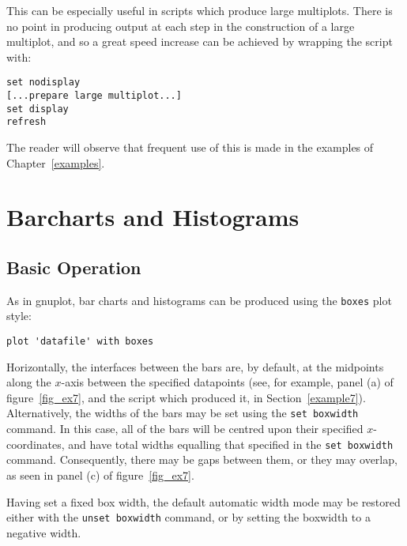\documentclass[a4paper,onecolumn,11pt]{book}
\begin{document}
This can be especially useful in scripts which produce large multiplots. There
is no point in producing output at each step in the construction of a large
multiplot, and so a great speed increase can be achieved by wrapping the script
with:

\begin{verbatim} 
set nodisplay
[...prepare large multiplot...]
set display
refresh
\end{verbatim}

The reader will observe that frequent use of this is made in the examples of
Chapter~\ref{examples}.

\section{Barcharts and Histograms}
\label{barcharts}

\subsection{Basic Operation}

As in gnuplot, bar charts and histograms can be produced using the
\texttt{boxes} plot style:

\begin{verbatim} 
plot 'datafile' with boxes
\end{verbatim}

\noindent Horizontally, the interfaces between the bars are, by default, at the
midpoints along the $x$-axis between the specified datapoints (see, for
example, panel (a) of figure~\ref{fig_ex7}, and the script which produced it,
in Section~\ref{example7}).  Alternatively, the widths of the bars may be set
using the \texttt{set boxwidth} command. In this case, all of the bars will be
centred upon their specified $x$-coordinates, and have total widths equalling
that specified in the \texttt{set boxwidth} command. Consequently, there may be gaps
between them, or they may overlap, as seen in panel (c) of
figure~\ref{fig_ex7}.

Having set a fixed box width, the default automatic width mode may be restored
either with the \texttt{unset boxwidth} command, or by setting the boxwidth to
a negative width.
\end{document}
